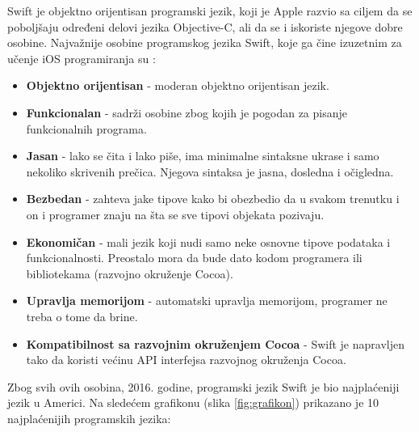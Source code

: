 \documentclass[a4paper]{article}
\begin{document}
Swift je objektno orijentisan programski jezik, koji je Apple razvio sa ciljem da 
se poboljšaju određeni delovi jezika Objective-C, ali da se i iskoriste njegove
dobre osobine. Najvažnije osobine programskog jezika Swift, koje ga čine izuzetnim za učenje iOS programiranja su \cite{swift_programming}:
\begin{itemize}
\item\textbf{Objektno orijentisan} - moderan objektno orijentisan jezik.
\item\textbf{Funkcionalan} - sadrži osobine zbog kojih je pogodan za pisanje funkcionalnih programa.
\item\textbf{Jasan} - lako se čita i lako piše, ima minimalne sintaksne ukrase i samo nekoliko skrivenih prečica. Njegova sintaksa je jasna, dosledna i očigledna.
\item\textbf{Bezbedan} - zahteva jake tipove kako bi obezbedio da u svakom trenutku i on i programer znaju na šta se sve tipovi objekata pozivaju.
\item\textbf{Ekonomičan} - mali jezik koji nudi samo neke osnovne tipove podataka i funkcionalnosti. Preostalo mora da bude dato kodom programera ili bibliotekama (razvojno okruženje Cocoa).
\item\textbf{Upravlja memorijom} - automatski upravlja memorijom, programer ne treba o tome da brine.
\item\textbf{Kompatibilnost sa razvojnim okruženjem Cocoa} -  Swift je napravljen tako da koristi većinu API interfejsa razvojnog okruženja Cocoa.
\end{itemize}

Zbog svih ovih osobina, 2016. godine, programski jezik Swift je bio najplaćeniji jezik u Americi. Na sledećem grafikonu (slika \ref{fig:grafikon}) prikazano je 10 najplaćenijih programskih jezika:
\end{document}
